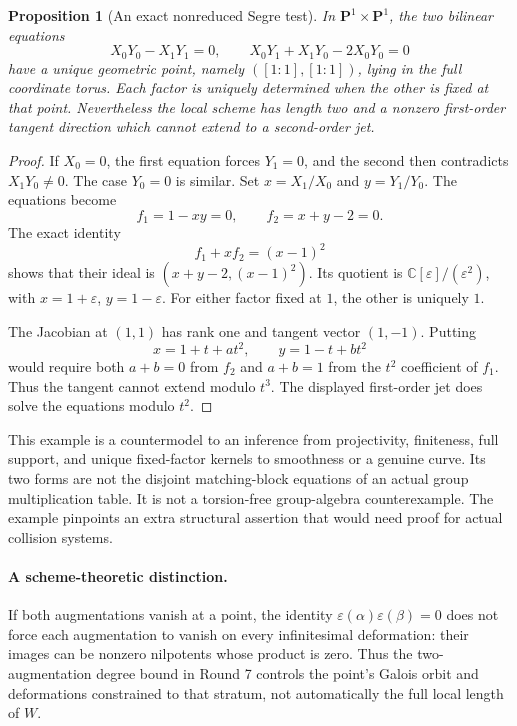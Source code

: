 \documentclass[11pt,a4paper,oneside]{report}
\newtheorem{proposition}[theorem]{Proposition}
\theoremstyle{definition}
\theoremstyle{remark}
\newcommand{\C}{\mathbb C}
\begin{document}
\begin{proposition}[An exact nonreduced Segre test]
\label{M13:next:nonreduced-model}
In $\mathbf P^1\times\mathbf P^1$, the two bilinear equations
\[
 X_0Y_0-X_1Y_1=0,
 \qquad X_0Y_1+X_1Y_0-2X_0Y_0=0
\]
have a unique geometric point, namely
$([1:1],[1:1])$, lying in the full coordinate torus.
Each factor is uniquely determined when the other is fixed at
that point. Nevertheless the local scheme has length two and a
nonzero first-order tangent direction which cannot extend to a
second-order jet.
\end{proposition}
\begin{proof}
If $X_0=0$, the first equation forces $Y_1=0$, and the second
then contradicts $X_1Y_0\ne0$. The case $Y_0=0$ is similar.
Set $x=X_1/X_0$ and $y=Y_1/Y_0$. The equations become
\[
 f_1=1-xy=0,\qquad f_2=x+y-2=0.
\]
The exact identity
\[
 f_1+xf_2=(x-1)^2
\]
shows that their ideal is $(x+y-2,(x-1)^2)$.
Its quotient is $\C[\varepsilon]/(\varepsilon^2)$, with
$x=1+\varepsilon$, $y=1-\varepsilon$.
For either factor fixed at $1$, the other is uniquely $1$.

The Jacobian at $(1,1)$ has rank one and tangent vector $(1,-1)$.
Putting
\[
 x=1+t+at^2,\qquad y=1-t+bt^2
\]
would require both $a+b=0$ from $f_2$ and $a+b=1$ from the
$t^2$ coefficient of $f_1$. Thus the tangent cannot extend modulo
$t^3$. The displayed first-order jet does solve the equations
modulo $t^2$.
\end{proof}

This example is a countermodel to an inference from projectivity,
finiteness, full support, and unique fixed-factor kernels to
smoothness or a genuine curve. Its two forms are not the disjoint
matching-block equations of an actual group multiplication table.
It is not a torsion-free group-algebra counterexample. The example
pinpoints an extra structural assertion that would need proof for
actual collision systems.

\paragraph{A scheme-theoretic distinction.}
If both augmentations vanish at a point, the identity
$\varepsilon(\alpha)\varepsilon(\beta)=0$ does not force each
augmentation to vanish on every infinitesimal deformation: their
images can be nonzero nilpotents whose product is zero. Thus the
two-augmentation degree bound in Round 7 controls the point's
Galois orbit and deformations constrained to that stratum, not
automatically the full local length of $W$.
\end{document}
